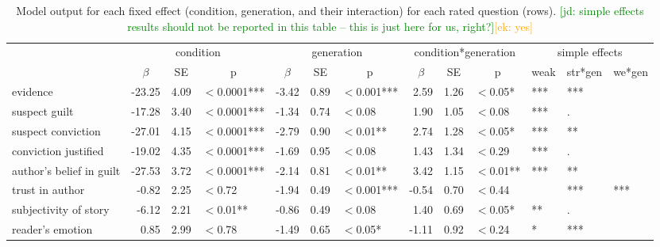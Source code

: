 \documentclass[10pt,letterpaper]{article}
\newcommand{\ek}[1]{\textcolor{Orange}{[ek: #1]}}
\newcommand{\jd}[1]{\textcolor{Green}{[jd: #1]}}
\begin{document}
\begin{table}
	\centering
	\begin{tabular}{l r r l r r l r r l l l l}
		\toprule
		& \multicolumn{3}{c}{condition} & \multicolumn{3}{c}{generation} & \multicolumn{3}{c}{condition*generation} & \multicolumn{3}{c}{simple effects}\\
		& \multicolumn{1}{c}{$\beta$} & \multicolumn{1}{c}{SE} & \multicolumn{1}{c}{p} & \multicolumn{1}{c}{$\beta$} & \multicolumn{1}{c}{SE} & \multicolumn{1}{c}{p} & \multicolumn{1}{c}{$\beta$} & \multicolumn{1}{c}{SE} & \multicolumn{1}{c}{p} & \multicolumn{1}{c}{weak} & \multicolumn{1}{c}{str*gen} & \multicolumn{1}{c}{we*gen}\\
		\midrule
	    evidence    & -23.25 & 4.09 & $<$0.0001*** & -3.42 & 0.89 & $<$0.001*** & 2.59  & 1.26 & $<$0.05*  & *** & *** & \\
		suspect guilt          & -17.28  & 3.40 & $<$0.0001*** & -1.34 & 0.74 & $<$0.08           & 1.90  & 1.05 & $<$0.08 & *** & . & \\
		suspect conviction   & -27.01 & 4.15  & $<$0.0001*** & -2.79 & 0.90 & $<$0.01**     & 2.74  & 1.28 & $<$0.05*  & *** & ** & \\
		conviction justified    & -19.02 & 4.35 & $<$0.0001***  & -1.69 & 0.95 & $<$0.08           & 1.43 & 1.34 & $<$0.29   & *** & . &  \\
		author's belief in guilt     & -27.53 & 3.72 & $<$0.0001***  & -2.14 & 0.81 & $<$0.01**      & 3.42  & 1.15 & $<$0.01** & *** & ** & \\
		trust in author           & -0.82   & 2.25 & $<$0.72           & -1.94 & 0.49 & $<$0.001*** & -0.54 & 0.70 & $<$0.44   & & *** & *** \\
		subjectivity of story  & -6.12   & 2.21 & $<$0.01**          & -0.86 & 0.49 & $<$0.08         & 1.40   & 0.69 & $<$0.05* & ** & . & \\
		reader's emotion & 0.85   & 2.99 & $<$0.78            & -1.49 & 0.65 & $<$0.05*     & -1.11  & 0.92 & $<$0.24  & * & *** & \\
		\bottomrule
	\end{tabular}
	\caption{Model output for each fixed effect (condition, generation, and their interaction) for each rated question (rows). \jd{simple effects results should not be reported in this table -- this is just here for us, right?}\ek{yes}}
	\label{tab:exp2results}
\end{table}
\end{document}
